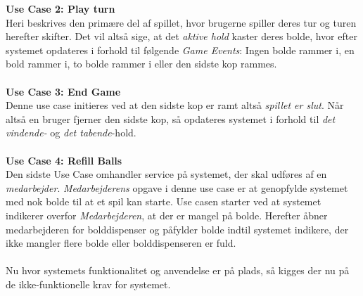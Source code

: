 \documentclass[Rapport/Rapport_main.tex]{subfiles}
\begin{document}
\textbf{Use Case 2: Play turn}\\
Heri beskrives den primære del af spillet, hvor brugerne spiller deres tur og turen herefter skifter. Det vil altså sige, at det \textit{aktive hold} kaster deres bolde, hvor efter systemet opdateres i forhold til følgende \textit{Game Events}: Ingen bolde rammer i, en bold rammer i, to bolde rammer i eller den sidste kop rammes.\\\\
\textbf{Use Case 3: End Game}\\
Denne use case initieres ved at den sidste kop er ramt altså \textit{spillet er slut}. Når altså en bruger fjerner den sidste kop, så opdateres systemet i forhold til \textit{det vindende-} og \textit{det tabende}-hold.\\\\
\textbf{Use Case 4: Refill Balls}\\
Den sidste Use Case omhandler service på systemet, der skal udføres af en \textit{medarbejder}. \textit{Medarbejderens} opgave i denne use case er at genopfylde systemet med nok bolde til at et spil kan starte. Use casen starter ved at systemet indikerer overfor \textit{Medarbejderen}, at der er mangel på bolde. Herefter åbner medarbejderen for bolddispenser og påfylder bolde indtil systemet indikere, der ikke mangler flere bolde eller bolddispenseren er fuld.\\\\
Nu hvor systemets funktionalitet og anvendelse er på plads, så kigges der nu på de ikke-funktionelle krav for systemet.
\end{document}
